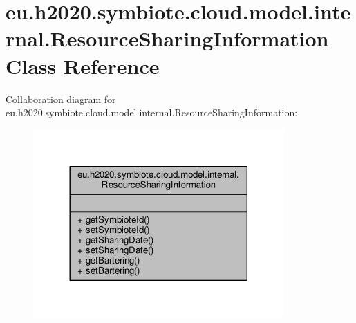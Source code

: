\hypertarget{classeu_1_1h2020_1_1symbiote_1_1cloud_1_1model_1_1internal_1_1ResourceSharingInformation}{}\section{eu.\+h2020.\+symbiote.\+cloud.\+model.\+internal.\+Resource\+Sharing\+Information Class Reference}
\label{classeu_1_1h2020_1_1symbiote_1_1cloud_1_1model_1_1internal_1_1ResourceSharingInformation}


Collaboration diagram for eu.\+h2020.\+symbiote.\+cloud.\+model.\+internal.\+Resource\+Sharing\+Information\+:\nopagebreak
\begin{figure}[H]
\begin{center}
\leavevmode
\includegraphics[width=272pt]{classeu_1_1h2020_1_1symbiote_1_1cloud_1_1model_1_1internal_1_1ResourceSharingInformation__coll__graph}
\end{center}
\end{figure}
